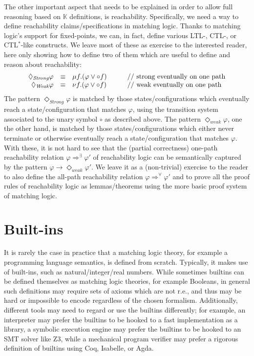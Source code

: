 \documentclass[UTF8,11pt]{article}
\theoremstyle{plain}
\theoremstyle{definition}
\theoremstyle{remark}
\newcommand{\K}{\mbox{$\mathbb{K}$}\xspace}
\begin{document}
The other important aspect that needs to be explained in order to allow
full reasoning based on \K definitions, is reachability.
Specifically, we need a way to define reachability claims/specifications
in matching logic.
Thanks to matching logic's support for fixed-points, we can, in fact,
define various LTL-, CTL-, or CTL$^*$-like constructs.
We leave most of these as exercise to the interested reader,
here only showing how to define two of them which are useful to define
and reason about reachability:
$$
\begin{array}{rcl@{\hspace*{7ex}}l}
\Diamond_{\textit{Strong}} \varphi & \equiv & \mu f . (\varphi \vee \circ f)
& \textrm{// strong eventually on one path}
\\
\Diamond_{\textit{Weak}} \varphi & \equiv & \nu f . (\varphi \vee \circ f)
& \textrm{// weak eventually on one path}
\end{array}
$$
The pattern $\Diamond_{\textit{Strong}}\varphi$ is matched by those
states/configurations which eventually reach a state/configuration that
matches $\varphi$, using the transition system associated to the unary
symbol $\circ$ as described above.
The pattern $\Diamond_{\textit{weak}}\varphi$, one the other hand, is matched
by those states/configurations which either never terminate or otherwise
eventually reach a state/configuration that matches $\varphi$.
With these, it is not hard to see that the (partial correctness) one-path
reachability relation $\varphi \Rightarrow^\exists \varphi'$ of reachability
logic \cite{stefanescu-park-yuwen-li-rosu-2016-oopsla} can be semantically
captured by the pattern
$\varphi \rightarrow \Diamond_{\textit{weak}}\varphi'$.
We leave it as a (non-trivial) exercise to the reader to also define the
all-path reachability relation $\varphi \Rightarrow^\forall\varphi'$ and to
prove all the proof rules of reachability logic as lemmas/theorems using the
more basic proof system of matching logic.


\section{Built-ins}
\label{sec:builtins}

It is rarely the case in practice that a matching logic theory, for example
a programming language semantics, is defined from scratch.
Typically, it makes use of built-ins, such as natural/integer/real numbers.
While sometimes builtins can be defined themselves as matching logic theories,
for example Booleans, in general such definitions may require sets of axioms
which are not r.e., and thus may be hard or impossible to encode regardless
of the chosen formalism.
Additionally, different tools may need to regard or use the builtins
differently;
for example, an interpreter may prefer the builtins to be hooked to a
fast implementation as a library, a symbolic execution engine may prefer the
builtins to be hooked to an SMT solver like Z3, while a mechanical program
verifier may prefer a rigorous definition of builtins using Coq, Isabelle,
or Agda.
\end{document}
